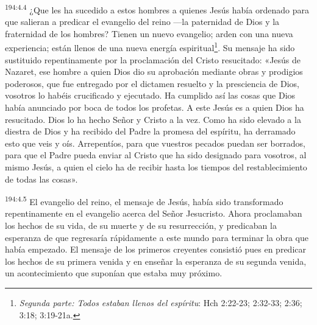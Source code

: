 \par 
\textsuperscript{194:4.4} ¿Que les ha sucedido a estos hombres a quienes Jesús había ordenado para que salieran a predicar el evangelio del reino ---la paternidad de Dios y la fraternidad de los hombres? Tienen un nuevo evangelio; arden con una nueva experiencia; están llenos de una nueva energía espiritual\footnote{\textit{Segunda parte: Todos estaban llenos del espíritu}: Hch 2:22-23; 2:32-33; 2:36; 3:18; 3:19-21a.}. Su mensaje ha sido sustituido repentinamente por la proclamación del Cristo resucitado: «Jesús de Nazaret, ese hombre a quien Dios dio su aprobación mediante obras y prodigios poderosos, que fue entregado por el dictamen resuelto y la presciencia de Dios, vosotros lo habéis crucificado y ejecutado. Ha cumplido así las cosas que Dios había anunciado por boca de todos los profetas. A este Jesús es a quien Dios ha resucitado. Dios lo ha hecho Señor y Cristo a la vez. Como ha sido elevado a la diestra de Dios y ha recibido del Padre la promesa del espíritu, ha derramado esto que veis y oís. Arrepentíos, para que vuestros pecados puedan ser borrados, para que el Padre pueda enviar al Cristo que ha sido designado para vosotros, al mismo Jesús, a quien el cielo ha de recibir hasta los tiempos del restablecimiento de todas las cosas».

\par 
\textsuperscript{194:4.5} El evangelio del reino, el mensaje de Jesús, había sido transformado repentinamente en el evangelio acerca del Señor Jesucristo. Ahora proclamaban los hechos de su vida, de su muerte y de su resurrección, y predicaban la esperanza de que regresaría rápidamente a este mundo para terminar la obra que había empezado. El mensaje de los primeros creyentes consistió pues en predicar los hechos de su primera venida y en enseñar la esperanza de su segunda venida, un acontecimiento que suponían que estaba muy próximo.

